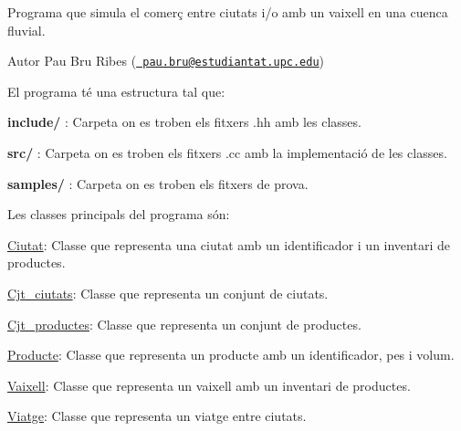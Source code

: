 Programa que simula el comerç entre ciutats i/o amb un vaixell en una cuenca fluvial.\begin{DoxyAuthor}{Autor}
Pau Bru Ribes (\href{mailto:pau.bru@estudiantat.upc.edu}{\texttt{ pau.\+bru@estudiantat.\+upc.\+edu}})
\end{DoxyAuthor}
El programa té una estructura tal que\+:
\begin{DoxyItemize}
\item {\bfseries{include/}} \+: Carpeta on es troben els fitxers .hh amb les classes.
\item {\bfseries{src/}} \+: Carpeta on es troben els fitxers .cc amb la implementació de les classes.
\item {\bfseries{samples/}} \+: Carpeta on es troben els fitxers de prova.
\end{DoxyItemize}

Les classes principals del programa són\+:
\begin{DoxyItemize}
\item \mbox{\hyperlink{classCiutat}{Ciutat}}\+: Classe que representa una ciutat amb un identificador i un inventari de productes.
\item \mbox{\hyperlink{classCjt__ciutats}{Cjt\+\_\+ciutats}}\+: Classe que representa un conjunt de ciutats.
\item \mbox{\hyperlink{classCjt__productes}{Cjt\+\_\+productes}}\+: Classe que representa un conjunt de productes.
\item \mbox{\hyperlink{classProducte}{Producte}}\+: Classe que representa un producte amb un identificador, pes i volum.
\item \mbox{\hyperlink{classVaixell}{Vaixell}}\+: Classe que representa un vaixell amb un inventari de productes.
\item \mbox{\hyperlink{classViatge}{Viatge}}\+: Classe que representa un viatge entre ciutats. 
\end{DoxyItemize}